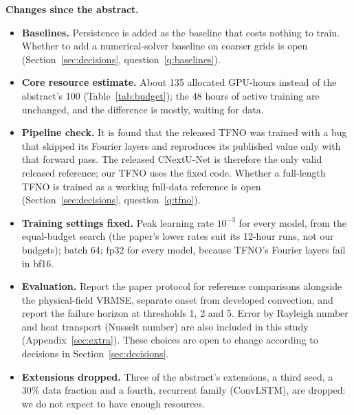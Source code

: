 \documentclass[11pt]{article}
\begin{document}
\textbf{Changes since the abstract.}
\begin{itemize}
    \item \textbf{Baselines.} Persistence is added as the baseline that costs nothing to train. Whether to add a
    numerical-solver baseline on coarser grids is open (Section~\ref{sec:decisions}, question~\ref{q:baselines}).
    \item \textbf{Core resource estimate.} About 135 allocated GPU-hours instead of the abstract's 100
    (Table~\ref{tab:budget}); the 48 hours of active training are unchanged, and the difference is mostly, waiting for data.
    \item \textbf{Pipeline check.} It is found that the released TFNO was trained with a bug that skipped its Fourier
    layers and reproduces its published value only with that forward pass. The released CNextU-Net is therefore the
    only valid released reference; our TFNO uses the fixed code. Whether a full-length TFNO is trained as a working
    full-data reference is open (Section~\ref{sec:decisions}, question~\ref{q:tfno}).
    \item \textbf{Training settings fixed.} Peak learning rate $10^{-3}$ for every model, from the equal-budget
    search (the paper's lower rates suit its 12-hour runs, not our budgets); batch 64; fp32 for every model,
    because TFNO's Fourier layers fail in bf16.
    \item \textbf{Evaluation.} Report the paper protocol for reference comparisons alongside the physical-field
    VRMSE, separate onset from developed convection, and report the failure horizon at thresholds 1, 2 and 5. Error by Rayleigh number and heat transport (Nusselt number) are also included in this study 
    (Appendix~\ref{sec:extra}). These choices are open to change according to decisions in Section~\ref{sec:decisions}.
    \item \textbf{Extensions dropped.} Three of the abstract's extensions, a third seed, a 30\% data fraction and a
    fourth, recurrent family (ConvLSTM), are dropped: we do not expect to have enough resources.
\end{itemize}
\end{document}

